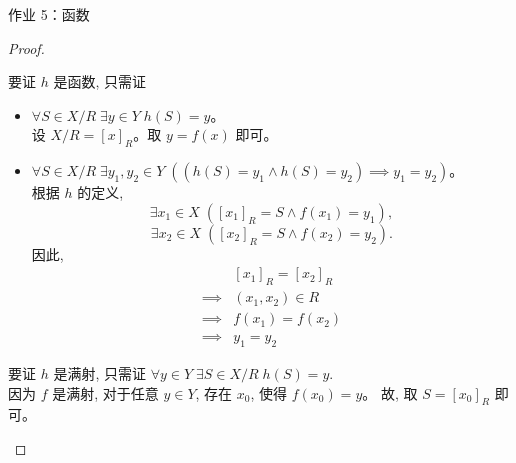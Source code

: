 \begin{frame}[allowframebreaks]{作业 5：函数}
\begin{proof}
\begin{enumerate}[(1)]
      要证 $h$ 是函数, 只需证
      \begin{itemize}
        \item $\forall S \in X/R\; \exists y \in Y\; h(S) = y$。\\
          设 $X/R = [x]_{R}$。取 $y = f(x)$ 即可。
        \item $\forall S \in X/R\; \exists y_{1}, y_{2} \in Y\;
          ((h(S) = y_{1} \land h(S) = y_{2}) \implies y_{1} = y_{2})$。\\
          根据 $h$ 的定义,
          \[
            \exists x_{1} \in X\; ([x_{1}]_{R} = S \land f(x_{1}) = y_{1}),
          \]
          \[
            \exists x_{2} \in X\; ([x_{2}]_{R} = S \land f(x_{2}) = y_{2}).
          \]
          因此,
          \begin{align*}
            & [x_{1}]_{R} = [x_{2}]_{R} \\
            \implies & (x_{1}, x_{2}) \in R \\
            \implies & f(x_{1}) = f(x_{2}) \\
            \implies & y_{1} = y_{2}
          \end{align*}
      \end{itemize}
      要证 $h$ 是满射, 只需证 $\forall y \in Y\; \exists S \in X/R\; h(S) = y$.\\
      因为 $f$ 是满射, 对于任意 $y \in Y$, 存在 $x_{0}$, 使得 $f(x_{0}) = y$。
      故, 取 $S = [x_{0}]_{R}$ 即可。
  \end{enumerate}
\end{proof}

\end{frame}
